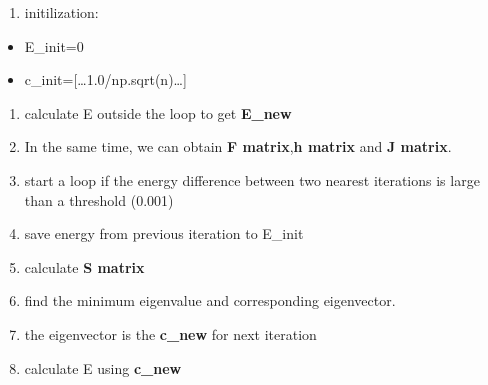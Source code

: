 \documentclass[11pt]{article}
\providecommand{\tightlist}{%
      \setlength{\itemsep}{0pt}\setlength{\parskip}{0pt}}
\begin{document}
\begin{enumerate}
\def\labelenumi{\arabic{enumi}.}
\tightlist
\item
  initilization:
\end{enumerate}

\begin{itemize}
\tightlist
\item
  E\_init=0
\item
  c\_init={[}\ldots1.0/np.sqrt(n)\ldots{]}
\end{itemize}

\begin{enumerate}
\def\labelenumi{\arabic{enumi}.}
\setcounter{enumi}{1}
\tightlist
\item
  calculate E outside the loop to get \textbf{E\_new}
\item
  In the same time, we can obtain \textbf{F matrix},\textbf{h matrix}
  and \textbf{J matrix}.
\item
  start a loop if the energy difference between two nearest iterations
  is large than a threshold (0.001)
\item
  save energy from previous iteration to E\_init
\item
  calculate \textbf{S matrix}
\item
  find the minimum eigenvalue and corresponding eigenvector.
\item
  the eigenvector is the \textbf{c\_new} for next iteration
\item
  calculate E using \textbf{c\_new}
\end{enumerate}
\end{document}
